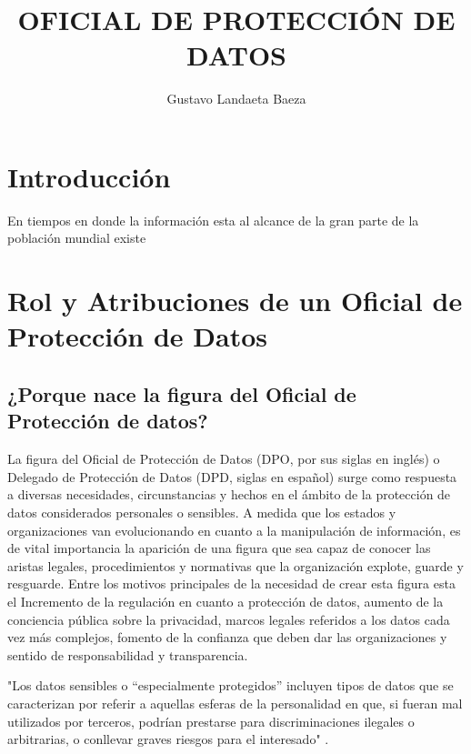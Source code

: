 \documentclass[stu, 11pt, letterpaper, donotrepeattitle, floatsintext, natbib]{apa7}
\title{\Large OFICIAL DE PROTECCIÓN DE DATOS}
\author{Gustavo Landaeta Baeza } %
\begin{document}
\maketitle


\renewcommand\contentsname{\largeÍndice}
\tableofcontents
\setcounter{tocdepth}{2}
\newpage


\section{\large Introducción}

\justify

\hspace{1.27cm} En tiempos en donde la información esta al alcance de la gran parte de la población mundial existe 
\hfill \break 


\newpage

\section{\large Rol y Atribuciones de un Oficial de Protección de Datos}

\subsection{¿Porque nace la figura del Oficial de Protección de datos?} 
La figura del Oficial de Protección de Datos (DPO, por sus siglas en inglés) o Delegado de Protección de Datos (DPD, siglas en español) surge como respuesta a diversas necesidades, circunstancias y hechos en el ámbito de la protección de datos considerados personales o sensibles. A medida que los estados y organizaciones van evolucionando en cuanto a la manipulación de información, es de vital importancia la aparición de una figura que sea capaz de conocer las aristas legales, procedimientos y normativas que la organización explote, guarde y resguarde.
	Entre los motivos principales de la necesidad de crear esta figura esta el Incremento de la regulación en cuanto a protección de datos, aumento de la conciencia pública sobre la privacidad, marcos legales referidos a los datos cada vez más complejos, fomento de la confianza que deben dar las organizaciones y sentido de responsabilidad y transparencia.

"Los datos sensibles o “especialmente protegidos” incluyen tipos de datos que se caracterizan por referir a aquellas esferas de la personalidad en que, si fueran mal utilizados por terceros, podrían prestarse para discriminaciones ilegales o arbitrarias, o conllevar graves riesgos para el interesado" \citep*{DerechoInformatico}.
\end{document}
